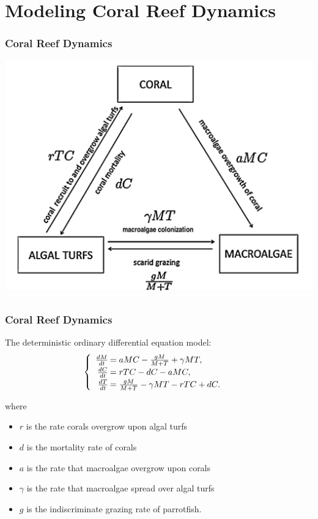 \section{Modeling Coral Reef Dynamics}

\begin{frame}
\frametitle{Coral Reef Dynamics}
\includegraphics[scale=.175]{./coral-reef-triangle.png}
\end{frame}

\begin{frame}\frametitle{Coral Reef Dynamics}
The deterministic ordinary differential equation model:
$$\begin{cases}\begin{array}{rl}
\frac{dM}{dt}\hspace{-.8em}&=aMC - \frac{gM}{M+T} + \gamma M T, \\
\frac{dC}{dt}\hspace{-.8em}&=rTC - dC - aMC, \\
\frac{dT}{dt}\hspace{-.8em}&=\frac{gM}{M + T} - \gamma MT - rTC + dC. 
\end{array}\end{cases}$$ 

where 
\begin{itemize}\itemsep0pt
\item $r$ is the rate corals overgrow upon algal turfs\\
\item $d$ is the mortality rate of corals\\
\item $a$ is the rate that macroalgae overgrow upon corals\\
\item $\gamma$ is the rate that macroalgae spread over algal turfs\\
\item $g$ is the indiscriminate grazing rate of parrotfish.
\end{itemize}
\end{frame}

